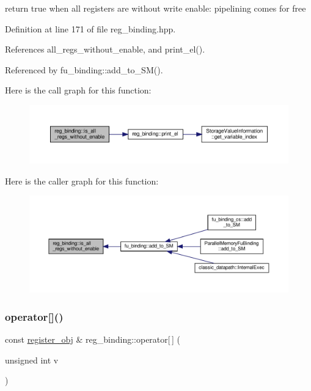 return true when all registers are without write enable\+: pipelining comes for free 



Definition at line 171 of file reg\+\_\+binding.\+hpp.



References all\+\_\+regs\+\_\+without\+\_\+enable, and print\+\_\+el().



Referenced by fu\+\_\+binding\+::add\+\_\+to\+\_\+\+S\+M().

Here is the call graph for this function\+:
\nopagebreak
\begin{figure}[H]
\begin{center}
\leavevmode
\includegraphics[width=350pt]{da/d7c/classreg__binding_a5a6584d2dea3c38dce0c7db265bfc2d7_cgraph}
\end{center}
\end{figure}
Here is the caller graph for this function\+:
\nopagebreak
\begin{figure}[H]
\begin{center}
\leavevmode
\includegraphics[width=350pt]{da/d7c/classreg__binding_a5a6584d2dea3c38dce0c7db265bfc2d7_icgraph}
\end{center}
\end{figure}
\mbox{\label{classreg__binding_a555a7ceaa089184a3d36a176d135378a}} 
\subsubsection{\texorpdfstring{operator[]()}{operator[]()}}
{\footnotesize\ttfamily const \hyperlink{classregister__obj}{register\+\_\+obj} \& reg\+\_\+binding\+::operator\mbox{[}$\,$\mbox{]} (\begin{DoxyParamCaption}\item[{unsigned int}]{v }\end{DoxyParamCaption})}



